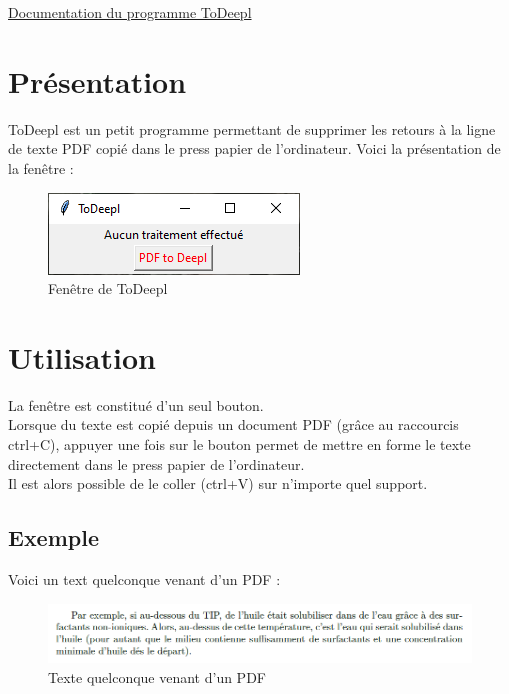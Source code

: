 \documentclass[a4paper, 11pt, twoside, table]{article}
\begin{document}
\everymath{\displaystyle}

\pagestyle{main}

\begin{center}
\Large \ul{Documentation du programme ToDeepl}
\end{center}

\section{Présentation}
ToDeepl est un petit programme permettant de supprimer les retours à la ligne de texte PDF copié dans le press papier de l'ordinateur. Voici la présentation de la fenêtre :
\begin{figure}[H]
	\centering 
	\includegraphics{data/ToDeepl.png}
	\caption{Fenêtre de ToDeepl}
	\label{fig_ToDeepl}
\end{figure}

\section{Utilisation}
\noindent
La fenêtre est constitué d'un seul bouton.\\

Lorsque du texte est copié depuis un document PDF (grâce au raccourcis ctrl+C), appuyer une fois sur le bouton permet de mettre en forme le texte directement dans le press papier de l'ordinateur.\\
Il est alors possible de le coller (ctrl+V) sur n'importe quel support.

	\subsection{Exemple}
Voici un text quelconque venant d'un PDF :
\begin{figure}[H]
	\centering 
	\includegraphics[width = \linewidth]{data/text_PDF.png}
	\caption{Texte quelconque venant d'un PDF}
	\label{fig_text_PDF}
\end{figure}
\end{document}
